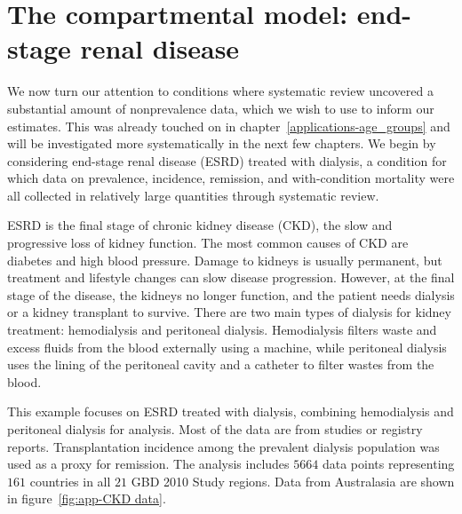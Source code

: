 \chapter{The compartmental model: end-stage renal disease}
\label{applications-fits_incon_v_con}

We now turn our attention to conditions where systematic review
uncovered a substantial amount of nonprevalence data, which we wish
to use to inform our estimates.  This was already touched on in
chapter~\ref{applications-age_groups} and will be investigated more
systematically in the next few chapters.  We begin by considering
end-stage renal disease (ESRD) treated with dialysis, a condition for which data on
prevalence, incidence, remission, and with-condition mortality were
all collected in relatively large quantities through systematic
review.

ESRD is the final stage of chronic kidney disease (CKD), the slow and
progressive loss of kidney function.  The most common causes of CKD
are diabetes and high blood pressure.  Damage to kidneys is usually
permanent, but treatment and lifestyle changes can slow disease progression.  However, at the final stage of the disease, the kidneys no longer function,
and the patient needs dialysis or a kidney transplant to survive.
There are two main types of
dialysis for kidney treatment: hemodialysis and peritoneal dialysis.
Hemodialysis filters waste and excess fluids from the blood
externally using a machine, while peritoneal dialysis uses the lining
of the peritoneal cavity and a catheter to filter wastes from the
blood. \cite{_k/doqi_2002, dipiro_pharmacotherapy:_2008}

This example focuses on ESRD treated with dialysis, combining hemodialysis
and peritoneal dialysis for analysis.
Most of the data are from studies or registry reports.
Transplantation incidence among the prevalent
dialysis population was used as a proxy for remission.  The analysis
includes $5664$ data points representing $161$ countries in
all $21$ GBD 2010 Study regions.  Data from Australasia are shown in
figure~\ref{fig:app-CKD data}.


